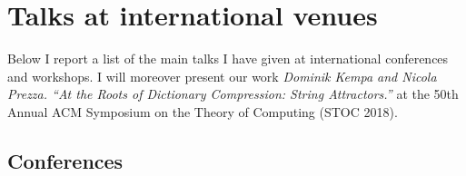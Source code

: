 \documentclass{article}
\begin{document}
%
%
%
%
%
%



\section*{Talks at international venues}

Below I report a list of the main talks I have given at international conferences and workshops. I will moreover present our work \emph{Dominik Kempa and Nicola Prezza. “At the Roots of Dictionary Compression: String Attractors.”} at the 50th Annual ACM Symposium on the Theory of Computing (STOC 2018). 

\subsection*{Conferences}
\end{document}
